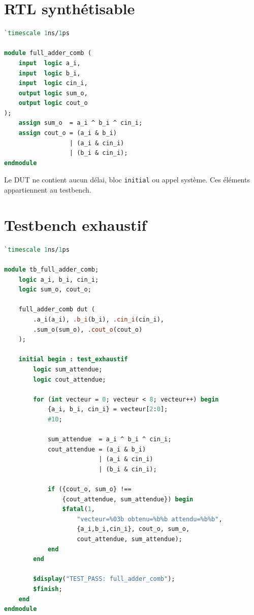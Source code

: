 \documentclass[11pt,a4paper,openany]{report}
\begin{document}
\section{RTL synthétisable}

\begin{lstlisting}[style=guidecode,language=SystemVerilog,
caption={full\_adder\_comb.sv}]
`timescale 1ns/1ps

module full_adder_comb (
    input  logic a_i,
    input  logic b_i,
    input  logic cin_i,
    output logic sum_o,
    output logic cout_o
);
    assign sum_o  = a_i ^ b_i ^ cin_i;
    assign cout_o = (a_i & b_i)
                  | (a_i & cin_i)
                  | (b_i & cin_i);
endmodule
\end{lstlisting}

Le DUT ne contient aucun délai, bloc \texttt{initial} ou appel système. Ces
éléments appartiennent au testbench.

\section{Testbench exhaustif}

\begin{lstlisting}[style=guidecode,language=SystemVerilog,
caption={tb\_full\_adder\_comb.sv}]
`timescale 1ns/1ps

module tb_full_adder_comb;
    logic a_i, b_i, cin_i;
    logic sum_o, cout_o;

    full_adder_comb dut (
        .a_i(a_i), .b_i(b_i), .cin_i(cin_i),
        .sum_o(sum_o), .cout_o(cout_o)
    );

    initial begin : test_exhaustif
        logic sum_attendue;
        logic cout_attendue;

        for (int vecteur = 0; vecteur < 8; vecteur++) begin
            {a_i, b_i, cin_i} = vecteur[2:0];
            #10;

            sum_attendue  = a_i ^ b_i ^ cin_i;
            cout_attendue = (a_i & b_i)
                          | (a_i & cin_i)
                          | (b_i & cin_i);

            if ({cout_o, sum_o} !==
                {cout_attendue, sum_attendue}) begin
                $fatal(1,
                    "vecteur=%03b obtenu=%b%b attendu=%b%b",
                    {a_i,b_i,cin_i}, cout_o, sum_o,
                    cout_attendue, sum_attendue);
            end
        end

        $display("TEST_PASS: full_adder_comb");
        $finish;
    end
endmodule
\end{lstlisting}
\end{document}
